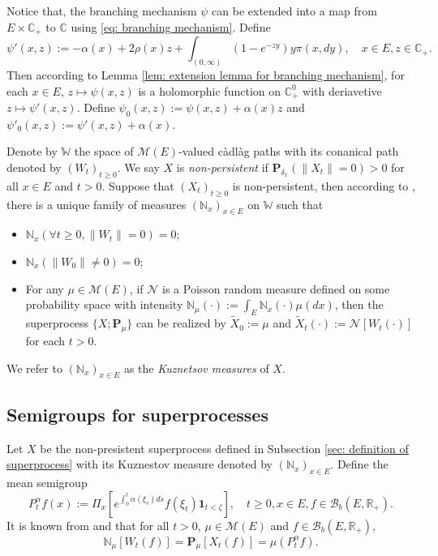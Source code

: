 \documentclass[12pt,a4paper]{amsart}
\theoremstyle{plain}
\theoremstyle{definition}
\numberwithin{equation}{section}
\begin{document}
    Notice that, the branching mechanism $\psi$ can be extended into a map from $E \times \mathbb C_+$ to $\mathbb C$ using \eqref{eq: branching mechanism}.
    Define
\begin{equation}
    \psi'(x,z):= - \alpha(x) + 2\rho(x) z + \int_{(0,\infty)} (1-e^{-zy})y\pi(x,dy),
    \quad x\in E, z\in \mathbb C_+.
\end{equation}
    Then according to Lemma \ref{lem: extension lemma for branching mechanism}, for each $x \in E$, $z \mapsto \psi(x,z)$ is a holomorphic function on $\mathbb C_+^0$ with deriavetive $z \mapsto \psi'(x,z)$.
    Define $\psi_0(x,z) := \psi(x,z)+ \alpha(x)z $ and $\psi'_0(x,z) := \psi'(x,z) + \alpha(x)$.

    Denote by $\mathbb W$ the space of $\mathcal M(E)$-valued c\`{a}dl\`{a}g paths with its conanical path denoted by $(W_t)_{t\geq 0}$.
    We say $X$ is \emph{non-persistent} if $\mathbf P_{\delta_x}(\|X_t\|= 0) > 0$ for all $x\in E$ and $t> 0$.
    Suppose that $(X_t)_{t\geq 0}$ is non-persistent, then according to \cite[Section 8.4]{Li2011Measure-valued},
    there is a unique family of measures $(\mathbb N_x)_{x\in E}$ on $\mathbb W$ such that
\begin{itemize}
\item
    $\mathbb N_x (\forall t \geq 0, \|W_t\|=0) =0$;
\item
    $\mathbb N_x(\|W_0 \|\neq 0) = 0$;
\item
    For any $\mu \in \mathcal M(E)$, if $\mathcal N$ is a Poisson random measure defined on some probability space
    with intensity $\mathbb N_\mu(\cdot):= \int_E \mathbb N_x(\cdot )\mu(dx)$,
    then the superprocess $\{X;\mathbf P_\mu\}$ can be realized by $\widetilde X_0 := \mu$ and $\widetilde X_t(\cdot) := \mathcal N[W_t(\cdot)]$ for each $t>0$.
\end{itemize}
    We refer to $(\mathbb N_x)_{x\in E}$ as the \emph{Kuznetsov measures} of $X$.
\subsection{{Semigroups for superprocesses}}
\label{sec: definition of vf}
    Let $X$ be the non-presistent superprocess defined in Subsection \ref{sec: definition of superprocess} with its Kuznestov measure denoted by $(\mathbb N_x)_{x\in E}$.
    Define the mean semigroup
\begin{equation}
       P_t^\alpha f(x)
    := \Pi_{x}[e^{\int_0^t \alpha(\xi_s)ds}f(\xi_t) \mathbf 1_{t< \zeta}],
    \quad t\geq 0, x\in E, f\in \mathcal B_b(E,\mathbb R_+).
\end{equation}
    It is known from \cite[Proposition 2.27]{Li2011Measure-valued} and \cite[Theorem 2.7]{Kyprianou2014Fluctuations} that for all $t > 0$, $\mu \in \mathcal M(E)$ and $f\in \mathcal B_b(E,\mathbb R_+)$,
\begin{equation}
\label{eq: mean formula for superprocesses}
    \mathbb N_{\mu}[W_t(f)]
    =\mathbf P_{\mu}[X_t(f)]=
       \mu(P^\alpha_t f).
\end{equation}
\end{document}
